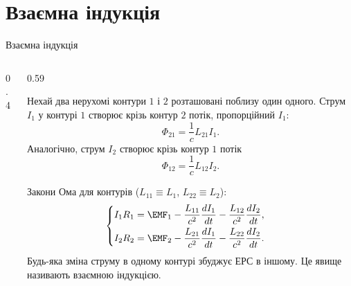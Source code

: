 \documentclass[onlytextwidth]{beamer}
\begin{document}
\section{Взаємна індукція}



\begin{frame}{Взаємна індукція}{}
	\begin{columns}
		\begin{column}{0.4\linewidth}\centering
			\begin{pict}\centering
				
			\end{pict}
		\end{column}
		\begin{column}{0.59\linewidth}
			\begin{overprint}
				\begin{block}{}\justifying
					Нехай два нерухомі контури $1$ і $2$ розташовані поблизу один одного. Струм $I_1$ у контурі $1$ створює крізь контур $2$ потік,
					пропорційний $I_1$:
					\begin{equation*}
						\Phi_{21} = \frac1c L_{21}I_1.
					\end{equation*}
					Аналогічно, струм $I_2$ створює крізь контур $1$ потік
					\begin{equation*}
						\Phi_{12} = \frac1c L_{12}I_2.
					\end{equation*}
				\end{block}
				\begin{block}{}\justifying
					Закони Ома для контурів ($L_{11} \equiv L_1$, $L_{22} \equiv L_2$):
					\begin{equation*}
						\begin{cases}
							I_1R_1 = \EMF_1 - \dfrac{L_{11}}{c^2}\dfrac{dI_1}{dt} - \dfrac{L_{12}}{c^2}\dfrac{dI_2}{dt},
							\\[1.5ex]
							I_2R_2 = \EMF_2 - \dfrac{L_{21}}{c^2}\dfrac{dI_1}{dt} - \dfrac{L_{22}}{c^2}\dfrac{dI_2}{dt}.
						\end{cases}
					\end{equation*}
					Будь-яка зміна струму в одному контурі збуджує ЕРС в іншому. Це явище називають \alert{взаємною індукцією}.
				\end{block}
			\end{overprint}
		\end{column}

\end{columns}
\end{frame}
\end{document}
